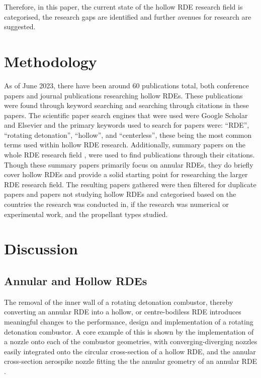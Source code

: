 \documentclass{article}
\begin{document}
Therefore, in this paper, the current state of the hollow RDE research field is categorised, the research gaps are identified and further avenues for research are suggested. 

\section{Methodology}

As of June 2023, there have been around 60 publications total, both conference papers and journal publications researching hollow RDEs. These publications were found through keyword searching and searching through citations in these papers. The scientific paper search engines that were used were Google Scholar and Elsevier and the primary keywords used to search for papers were: “RDE”, “rotating detonation”, “hollow”, and “centerless”, these being the most common terms used within hollow RDE research. Additionally, summary papers on the whole RDE research field \cite{1Anand2019,Xie2020}, were used to find publications through their citations. Though these summary papers primarily focus on annular RDEs, they do briefly cover hollow RDEs and provide a solid starting point for researching the larger RDE research field. The resulting papers gathered were then filtered for duplicate papers and papers not studying hollow RDEs and categorised based on the countries the research was conducted in, if the research was numerical or experimental work, and the propellant types studied. 


\section{Discussion}\label{sec:Discussion}
\subsection{Annular and Hollow RDEs}\label{subsecAnnular and Hollow RDEs}

The removal of the inner wall of a rotating detonation combustor, thereby converting an annular RDE into a hollow, or centre-bodiless RDE introduces meaningful changes to the performance, design and implementation of a rotating detonation combustor. A core example of this is shown by the implementation of a nozzle onto each of the combustor geometries, with converging-diverging nozzles easily integrated onto the circular cross-section of a hollow RDE, and the annular cross-section aerospike nozzle fitting the the annular geometry of an annular RDE \cite{1Anand2019}.
\par
\end{document}
